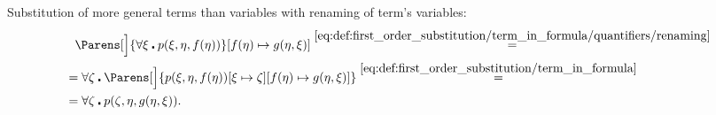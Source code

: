 \begin{example}
\begin{ExEnum}
     Substitution of more general terms than variables with renaming of term's variables:
    \begin{align*}
      &{}\phantom{=}{}
      \Parens[\Big]{\forall \xi \centerdot p(\xi, \eta, f(\eta))}[f(\eta) \mapsto g(\eta, \xi)]
      \overset {\eqref{eq:def:first_order_substitution/term_in_formula/quantifiers/renaming}} = \\ &=
      \forall \zeta \centerdot \Parens[\Big]{p(\xi, \eta, f(\eta))[\xi \mapsto \zeta][f(\eta) \mapsto g(\eta, \xi)]}
      \overset {\eqref{eq:def:first_order_substitution/term_in_formula}} = \\ &=
      \forall \zeta \centerdot p(\zeta, \eta, g(\eta, \xi)).
    \end{align*}
  \end{ExEnum}
\end{example}

